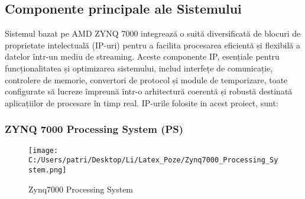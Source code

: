 \documentclass[12pt]{article}
\begin{document}
\subsection{Componente principale ale Sistemului}
\hspace*{1cm}Sistemul bazat pe AMD ZYNQ 7000 integrează o suită diversificată de blocuri de proprietate intelectuală (IP-uri) pentru a facilita procesarea eficientă și flexibilă a datelor într-un mediu de streaming. Aceste componente IP, esențiale pentru funcționalitatea și optimizarea sistemului, includ interfețe de comunicație, controlere de memorie, convertori de protocol și module de temporizare, toate configurate să lucreze împreună într-o arhitectură coerentă și robustă destinată aplicațiilor de procesare în timp real. IP-urile folosite in acest proiect, sunt: 



\subsubsection{ZYNQ 7000 Processing System (PS)}

\begin{figure}[H]
    \centering
    \texttt{[image: C:/Users/patri/Desktop/Li/Latex\_Poze/Zynq7000\_Processing\_System.png]}
    \caption{Zynq7000 Processing System}
\end{figure}
 
\end{document}
